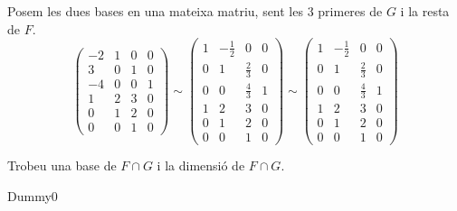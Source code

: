 \documentclass[a4paper, 12pt]{article}
\begin{document}
    \begin{solucio}
        Posem les dues bases en una mateixa matriu, sent les 3 primeres de $G$ i la resta de $F$.
        \begin{displaymath}
            \left(
                \begin{array}{cccc}
                    -2 & 1 & 0 & 0\\
                    3 & 0 & 1 & 0\\
                    -4 & 0 & 0 & 1\\
                    1 & 2 & 3 & 0\\
                    0 & 1 & 2 & 0\\
                    0 & 0 & 1 & 0
                \end{array}
            \right)
            \sim
            \left(
                \begin{array}{cccc}
                    1 & -\frac{1}{2} & 0 & 0\\
                    0 & 1 & \frac{2}{3} & 0\\
                    0 & 0 & \frac{4}{3} & 1\\
                    1 & 2 & 3 & 0\\
                    0 & 1 & 2 & 0\\
                    0 & 0 & 1 & 0
                \end{array}
            \right)
            \sim
            \left(
                \begin{array}{cccc}
                    1 & -\frac{1}{2} & 0 & 0\\
                    0 & 1 & \frac{2}{3} & 0\\
                    0 & 0 & \frac{4}{3} & 1\\
                    1 & 2 & 3 & 0\\
                    0 & 1 & 2 & 0\\
                    0 & 0 & 1 & 0
                \end{array}
            \right)
        \end{displaymath}
    \end{solucio}
    \begin{exercici}
        Trobeu una base de $F \cap G$ i la dimensió de $F \cap G$.
    \end{exercici}
    \begin{solucio}
        Dummy0
    \end{solucio}
\end{document}
